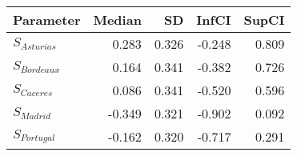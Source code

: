 \begin{table}[ht]
\centering
\begin{tabular}{lrrrr}
  \hline
Parameter & Median & SD & InfCI & SupCI \\ 
  \hline
$S_{Asturias}$ & 0.283 & 0.326 & -0.248 & 0.809 \\ 
  $S_{Bordeaux}$ & 0.164 & 0.341 & -0.382 & 0.726 \\ 
  $S_{Caceres}$ & 0.086 & 0.341 & -0.520 & 0.596 \\ 
  $S_{Madrid}$ & -0.349 & 0.321 & -0.902 & 0.092 \\ 
  $S_{Portugal}$ & -0.162 & 0.320 & -0.717 & 0.291 \\ 
   \hline
\end{tabular}
\end{table}
